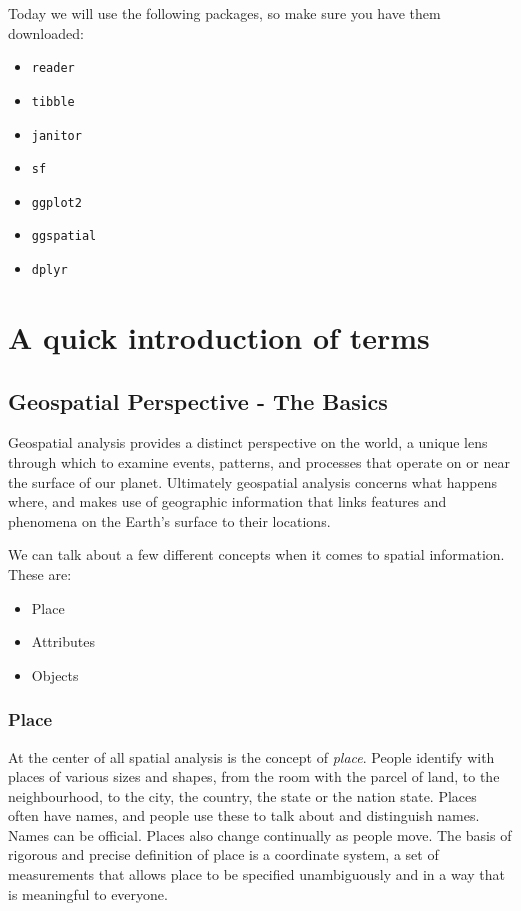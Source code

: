 \documentclass[
]{book}
\providecommand{\tightlist}{%
  \setlength{\itemsep}{0pt}\setlength{\parskip}{0pt}}
\begin{document}
Today we will use the following packages, so make sure you have them downloaded:

\begin{itemize}
\tightlist
\item
  \texttt{reader}
\item
  \texttt{tibble}
\item
  \texttt{janitor}
\item
  \texttt{sf}
\item
  \texttt{ggplot2}
\item
  \texttt{ggspatial}
\item
  \texttt{dplyr}
\end{itemize}

\hypertarget{a-quick-introduction-of-terms}{%
\section{A quick introduction of terms}\label{a-quick-introduction-of-terms}}

\hypertarget{geospatial-perspective---the-basics}{%
\subsection{Geospatial Perspective - The Basics}\label{geospatial-perspective---the-basics}}

Geospatial analysis provides a distinct perspective on the world, a unique lens through which to examine events, patterns, and processes that operate on or near the surface of our planet. Ultimately geospatial analysis concerns what happens where, and makes use of geographic information that links features and phenomena on the Earth's surface to their locations.

We can talk about a few different concepts when it comes to spatial information. These are:

\begin{itemize}
\tightlist
\item
  Place
\item
  Attributes
\item
  Objects
\end{itemize}

\hypertarget{place}{%
\subsubsection{Place}\label{place}}

At the center of all spatial analysis is the concept of \emph{place}. People identify with places of various sizes and shapes, from the room with the parcel of land, to the neighbourhood, to the city, the country, the state or the nation state. Places often have names, and people use these to talk about and distinguish names. Names can be official. Places also change continually as people move. The basis of rigorous and precise definition of place is a coordinate system, a set of measurements that allows place to be specified unambiguously and in a way that is meaningful to everyone.
\end{document}
